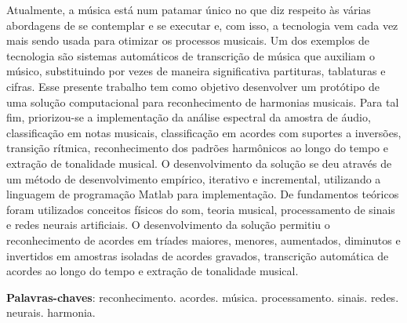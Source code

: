 \begin{resumo}
 Atualmente, a música está num patamar único no que diz respeito às várias abordagens de se contemplar e se executar e, com isso, a tecnologia vem cada vez mais sendo usada para otimizar os processos musicais. Um dos exemplos de tecnologia são sistemas automáticos de transcrição de música que auxiliam o músico, substituindo por vezes de maneira significativa partituras, tablaturas e cifras. Esse presente trabalho tem como objetivo desenvolver um protótipo de uma solução computacional para reconhecimento de harmonias musicais. Para tal fim, priorizou-se a implementação da análise espectral da amostra de áudio, classificação em notas musicais, classificação em acordes com suportes a inversões, transição rítmica, reconhecimento dos padrões harmônicos ao longo do tempo e extração de tonalidade musical. O desenvolvimento da solução se deu através de um método de desenvolvimento empírico, iterativo e incremental, utilizando a linguagem de programação Matlab para implementação. De fundamentos teóricos foram utilizados conceitos físicos do som, teoria musical, processamento de sinais e redes neurais artificiais. O desenvolvimento da solução permitiu o reconhecimento de acordes em tríades maiores, menores, aumentados, diminutos e invertidos em amostras isoladas de acordes gravados, transcrição automática de acordes ao longo do tempo e extração de tonalidade musical.

 \vspace{\onelineskip}

 \noindent
 \textbf{Palavras-chaves}: reconhecimento. acordes. música. processamento. sinais. redes. neurais. harmonia.
\end{resumo}
